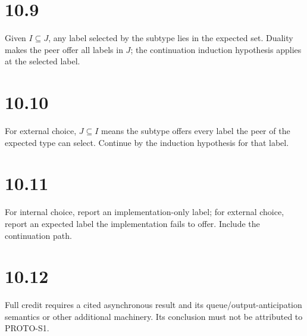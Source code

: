 \section*{10.9}
Given $I\subseteq J$, any label selected by the subtype lies in the expected set. Duality makes the peer offer all labels in $J$; the continuation induction hypothesis applies at the selected label.

\section*{10.10}
For external choice, $J\subseteq I$ means the subtype offers every label the peer of the expected type can select. Continue by the induction hypothesis for that label.

\section*{10.11}
For internal choice, report an implementation-only label; for external choice, report an expected label the implementation fails to offer. Include the continuation path.

\section*{10.12}
Full credit requires a cited asynchronous result and its queue/output-anticipation semantics or other additional machinery. Its conclusion must not be attributed to PROTO-S1.
